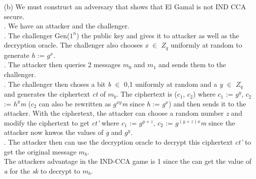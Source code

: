 \documentclass[10pt]{article}
\begin{document}
(b) We must construct an adversary that shows that El Gamal is not IND CCA secure.\\
. We have an attacker and the challenger.\\
. The challenger Gen($1^{n}$) the public key and gives it to attacker as well as the decryption oracle. The challenger also chooses \emph{x} $\in$ \textbf{$Z_{q}$} uniformly at random to generate \emph{h} := \emph{$g^{x}$}.\\
. The attacker then queries 2 messages $m_{0}$ and $m_{1}$ and sends them to the challenger.\\
. The challenger then choses a bit \emph{b} $\in$ {0,1} uniformly at random and a \emph{y} $\in$ \textbf{$Z_{q}$} and generates the ciphertext \emph{ct} of $m_{b}$. The ciphertext is ($c_{1}$, $c_{2}$) where $c_{1}$ := $g^{y}$, $c_{2}$ := \emph{$h^{y}$m} ($c_{2}$ can also be rewritten as \emph{$g^{xy}$m} since \emph{h} := \emph{$g^{x}$}) and then sends it to the attacker. With the ciphertext, the attacker can choose a random number \emph{z} and modify the ciphertext to get \emph{ct'} where $c_{1}$ := $g^{y+z}$, $c_{2}$ := \emph{$g^{(y+z)x}$m} since the attacker now knwos the values of \emph{g} and \emph{$g^{y}$}.\\
. The attacker then can use the decryption oracle to decrypt this ciphertext \emph{ct'} to get the original message \emph{$m_{b}$}.\\

\indent The attackers advantage in the IND-CCA game is 1 since the can get the value of \emph{a} for the \emph{sk} to decrypt to $m_{b}$.\\
\end{document}
